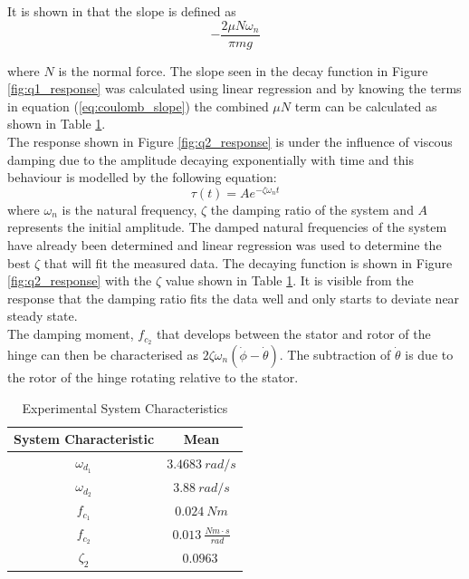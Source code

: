 It is shown in \citet{coulomb_friction} that the slope is defined as 
\begin{equation} \label{eq:coulomb_slope}
-\frac{2\mu N \omega_{n}}{\pi mg}
\end{equation}

where $N$  is the normal force. The slope seen in the decay function in Figure \ref{fig:q1_response} was calculated using linear regression and by knowing the terms in equation (\ref{eq:coulomb_slope}) the combined $\mu N$ term can be calculated as shown in Table \ref{table:system_characteristic}.\\

The response shown in Figure \ref{fig:q2_response} is under the influence of viscous damping due to the amplitude decaying exponentially with time and this behaviour is modelled by the following equation: $$\tau(t) = Ae^{-\zeta \omega_{n}t}$$ where $\omega_{n}$ is the natural frequency, $\zeta$ the damping ratio of the system and $A$ represents the initial amplitude. The damped natural frequencies of the system have already been determined and linear regression was used to determine the best $\zeta$ that will fit the measured data. The decaying function is shown in Figure \ref{fig:q2_response} with the $\zeta$ value shown in Table \ref{table:system_characteristic}. It is visible from the response that the damping ratio fits the data well and only starts to deviate near steady state.\\

The damping moment, $f_{c_{2}}$ that develops between the stator and rotor of the hinge can then be characterised as $2\zeta\omega_{n}(\dot{\phi}-\dot{\theta})$. The subtraction of $\dot{\theta}$ is due to the rotor of the hinge rotating relative to the stator.

\begin{table}[]
	\centering
	\begin{tabular}{|c|c|}
		\hline
		System Characteristic & Mean\\
		\hline
		\hline
		$ \omega_{d_{1}} $ &$ \SI{3.4683}{rad/s}$ \\
		\hline
		$ \omega_{d_{2}} $ &$ \SI{3.88}{rad/s}$  \\ 
		\hline
		$ f_{c_{1}} $ &$ \SI{0.024}{Nm}$  \\
		\hline
		$ f_{c_{2}} $ &$ \SI{0.013}{\frac{Nm\cdot s}{rad}}$  \\ 
		\hline
		$ \zeta_{2} $ &$ \SI{0.0963}{}$\\
		\hline
	\end{tabular}
	\caption{Experimental System Characteristics}
	\label{table:system_characteristic}
\end{table}


